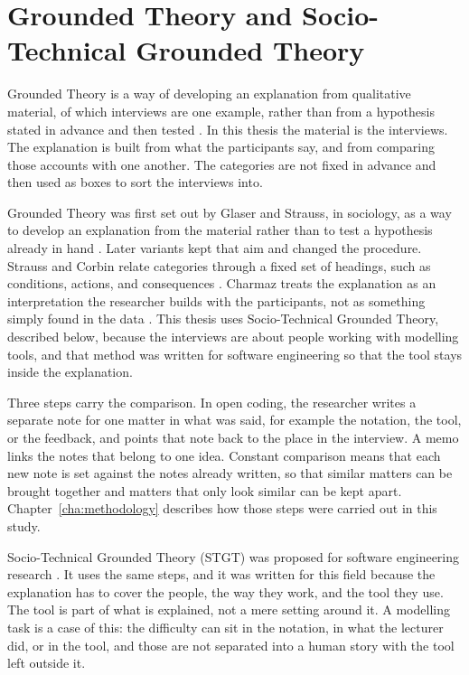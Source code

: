\section{Grounded Theory and Socio-Technical Grounded Theory}
\label{sec:grounded_theory}

Grounded Theory is a way of developing an explanation from qualitative material, of which interviews are one example, rather than from a hypothesis stated in advance and then tested \cite{glaser1967discovery,stol2016grounded}. In this thesis the material is the interviews. The explanation is built from what the participants say, and from comparing those accounts with one another. The categories are not fixed in advance and then used as boxes to sort the interviews into.

Grounded Theory was first set out by Glaser and Strauss, in sociology, as a way to develop an explanation from the material rather than to test a hypothesis already in hand \cite{glaser1967discovery}. Later variants kept that aim and changed the procedure. Strauss and Corbin relate categories through a fixed set of headings, such as conditions, actions, and consequences \cite{strauss1998basics}. Charmaz treats the explanation as an interpretation the researcher builds with the participants, not as something simply found in the data \cite{charmaz2006constructing}. This thesis uses Socio-Technical Grounded Theory, described below, because the interviews are about people working with modelling tools, and that method was written for software engineering so that the tool stays inside the explanation.

Three steps carry the comparison. In open coding, the researcher writes a separate note for one matter in what was said, for example the notation, the tool, or the feedback, and points that note back to the place in the interview. A memo links the notes that belong to one idea. Constant comparison means that each new note is set against the notes already written, so that similar matters can be brought together and matters that only look similar can be kept apart. Chapter~\ref{cha:methodology} describes how those steps were carried out in this study.

Socio-Technical Grounded Theory (STGT) was proposed for software engineering research \cite{hoda2018socio}. It uses the same steps, and it was written for this field because the explanation has to cover the people, the way they work, and the tool they use. The tool is part of what is explained, not a mere setting around it. A modelling task is a case of this: the difficulty can sit in the notation, in what the lecturer did, or in the tool, and those are not separated into a human story with the tool left outside it.

